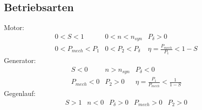 \subsection{Betriebsarten}
Motor: 
\[ \begin{array}{llllll}
0 < S < 1 
  & 0 < n < n_{syn} 
  & P_\delta > 0 
  \\ 0 < P_{mech} < P_1 
  & 0 < P_2 < P_\delta 
  & \eta = \frac{P_{mech}}{P_1} < 1 - S
\end{array} \]
Generator: 
\[ \begin{array}{llllll}
S < 0 
  & n > n_{syn} 
  & P_\delta < 0 
  \\ P_{mech} < 0 
  & P_2 > 0
  & \eta = \frac{P_1}{P_{mech}} < \frac{1}{1 - S}
\end{array} \]
Gegenlauf: 
\[ \begin{array}{llllll}
S > 1 
  & n < 0
  & P_\delta > 0 
  & P_{mech} > 0
  & P_2 > 0
\end{array} \]
